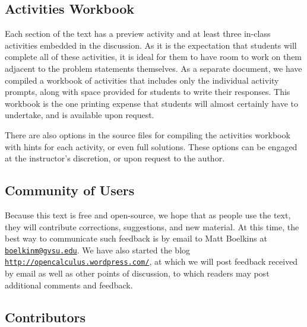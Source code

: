 \subsection*{Activities Workbook}

Each section of the text has a preview activity and at least three in-class activities embedded in the discussion.  As it is the expectation that students will complete all of these activities, it is ideal for them to have room to work on them adjacent to the problem statements themselves.  As a separate document, we have compiled a workbook of activities that includes only the individual activity prompts, along with space provided for students to write their responses.  This workbook is the one printing expense that students will almost certainly have to undertake, and is available upon request.

There are also options in the source files for compiling the activities workbook with hints for each activity, or even full solutions.  These options can be engaged at the instructor's discretion, or upon request to the author.



\subsection*{Community of Users}

Because this text is free and open-source, we hope that as people use the text, they will contribute corrections, suggestions, and new material.  At this time, the best way to communicate such feedback is by email to Matt Boelkins at \href{mailto:boelkinm@gvsu.edu}{\texttt{boelkinm@gvsu.edu}}.  We have also started the blog \href{http://opencalculus.wordpress.com/}{\texttt{http://opencalculus.wordpress.com/}}, at which we will post feedback received by email as well as other points of discussion, to which readers may post additional comments and feedback.

\subsection*{Contributors}

